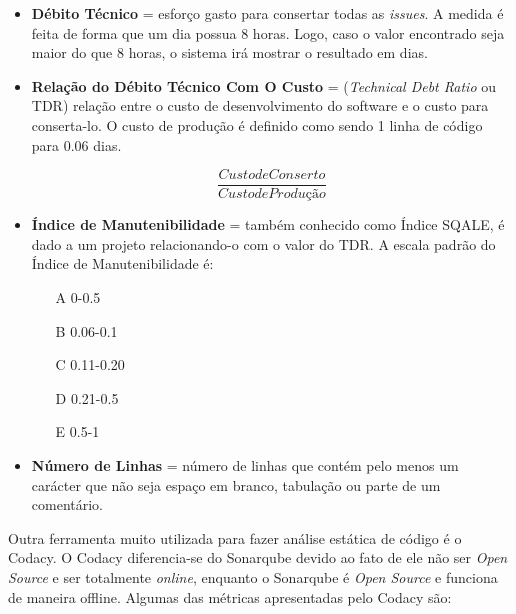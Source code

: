 \begin{itemize}
\item\textbf{Débito Técnico} = esforço gasto para consertar todas as \textit{issues}. A medida é feita de forma que um dia possua 8 horas. Logo, caso o valor encontrado seja maior do que 8 horas, o sistema irá mostrar o resultado em dias.

\item\textbf{Relação do Débito Técnico Com O Custo} = (\textit{Technical Debt Ratio} ou TDR) relação entre o custo de desenvolvimento do software e o custo para conserta-lo. O custo de produção é definido como sendo 1 linha de código para 0.06 dias.

\[\frac{Custo de Conserto}{Custo de Produção}\]

\item\textbf{Índice de Manutenibilidade} = também conhecido como Índice SQALE, é dado a um projeto relacionando-o com o valor do TDR. A escala  padrão do Índice de Manutenibilidade é: 
\begin{itemize}
\item[A] 0-0.5
\item[B] 0.06-0.1
\item[C] 0.11-0.20
\item[D] 0.21-0.5
\item[E] 0.5-1
\end{itemize}

\item\textbf{Número de Linhas} = número de linhas que contém pelo menos um carácter que não seja espaço em branco, tabulação ou parte de um comentário.

\end{itemize}

Outra ferramenta muito utilizada para fazer análise estática de código é o Codacy. O Codacy diferencia-se do Sonarqube devido ao fato de ele não ser \textit{Open Source} e ser totalmente \textit{online}, enquanto o Sonarqube é \textit{Open Source} e funciona de maneira offline. Algumas das métricas apresentadas pelo Codacy são: 

